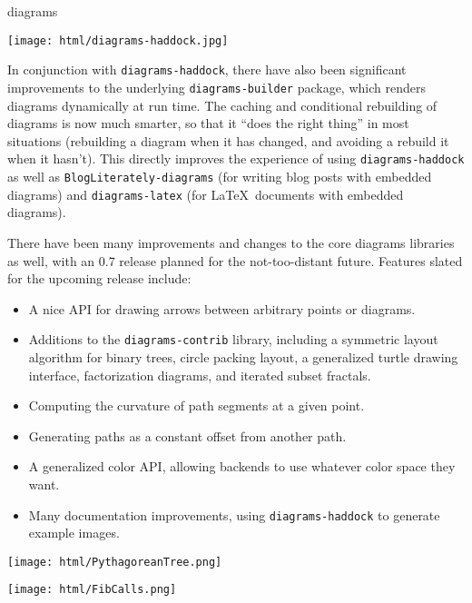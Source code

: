 \documentclass{article}
\begin{document}
\begin{hcarentry}[updated]{diagrams}
\begin{center}
\texttt{[image: html/diagrams-haddock.jpg]}
\end{center}

In conjunction with \texttt{diagrams-haddock}, there have also been
significant improvements to the underlying \texttt{diagrams-builder}
package, which renders diagrams dynamically at run time.  The caching
and conditional rebuilding of diagrams is now much smarter, so that it
``does the right thing'' in most situations (rebuilding a diagram when
it has changed, and avoiding a rebuild it when it hasn't).  This
directly improves the experience of using \texttt{diagrams-haddock} as
well as \texttt{BlogLiterately-diagrams} (for writing blog posts with
embedded diagrams) and \texttt{diagrams-latex} (for \LaTeX\ documents
with embedded diagrams).

There have been many improvements and changes to the core
diagrams libraries as well, with an 0.7 release planned for the
not-too-distant future. Features slated for the upcoming release
include:
\begin{itemize}
\item A nice API for drawing arrows between arbitrary points or diagrams.
\item Additions to the \texttt{diagrams-contrib} library, including a
  symmetric layout algorithm for binary trees, circle packing layout, a
  generalized turtle drawing interface, factorization diagrams, and
  iterated subset fractals.
\item Computing the curvature of path segments at a given point.
\item Generating paths as a constant offset from another path.
\item A generalized color API, allowing backends to use whatever color
  space they want.
\item Many documentation improvements, using \texttt{diagrams-haddock}
  to  generate example images.
\end{itemize}

\begin{center}
\texttt{[image: html/PythagoreanTree.png]}
\end{center}


\begin{center}
\texttt{[image: html/FibCalls.png]}
\end{center}


\end{hcarentry}
\end{document}
